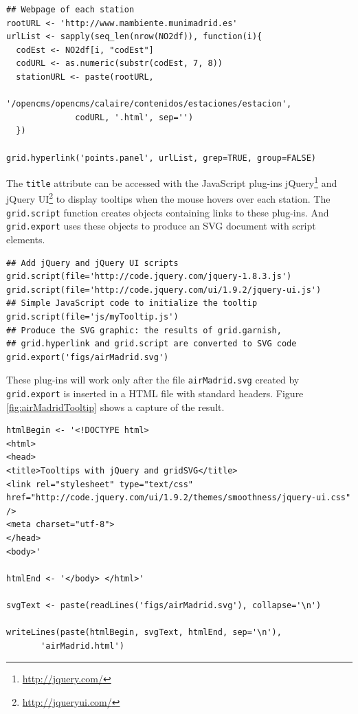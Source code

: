 \documentclass[smallroyalvopaper]{memoir}
\begin{document}
\lstset{language=R,numbers=none}
\begin{lstlisting}
## Webpage of each station
rootURL <- 'http://www.mambiente.munimadrid.es'
urlList <- sapply(seq_len(nrow(NO2df)), function(i){
  codEst <- NO2df[i, "codEst"]
  codURL <- as.numeric(substr(codEst, 7, 8))
  stationURL <- paste(rootURL,
		      '/opencms/opencms/calaire/contenidos/estaciones/estacion',
		      codURL, '.html', sep='')
  })

grid.hyperlink('points.panel', urlList, grep=TRUE, group=FALSE)
\end{lstlisting}


The \texttt{title} attribute can be accessed with the JavaScript plug-ins
jQuery\footnote{\url{http://jquery.com/}} and jQuery UI\footnote{\url{http://jqueryui.com/}} to display tooltips when the mouse
hovers over each station. The \texttt{grid.script} function creates objects
containing links to these plug-ins. And \texttt{grid.export} uses these
objects to produce an SVG document with script elements.


\lstset{language=R,numbers=none}
\begin{lstlisting}
## Add jQuery and jQuery UI scripts
grid.script(file='http://code.jquery.com/jquery-1.8.3.js')
grid.script(file='http://code.jquery.com/ui/1.9.2/jquery-ui.js')
## Simple JavaScript code to initialize the tooltip
grid.script(file='js/myTooltip.js')
## Produce the SVG graphic: the results of grid.garnish,
## grid.hyperlink and grid.script are converted to SVG code
grid.export('figs/airMadrid.svg')
\end{lstlisting}

These plug-ins will work only after the file \texttt{airMadrid.svg} created by
\texttt{grid.export} is inserted in a HTML file with standard headers. Figure
\ref{fig:airMadridTooltip} shows a capture of the result.

\lstset{language=R,numbers=none}
\begin{lstlisting}
htmlBegin <- '<!DOCTYPE html>
<html>
<head>
<title>Tooltips with jQuery and gridSVG</title>
<link rel="stylesheet" type="text/css" href="http://code.jquery.com/ui/1.9.2/themes/smoothness/jquery-ui.css" />
<meta charset="utf-8">
</head>
<body>'

htmlEnd <- '</body> </html>'

svgText <- paste(readLines('figs/airMadrid.svg'), collapse='\n')

writeLines(paste(htmlBegin, svgText, htmlEnd, sep='\n'),
	   'airMadrid.html')
\end{lstlisting}
\end{document}
